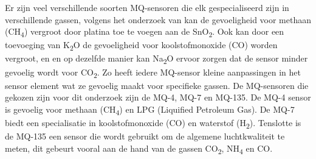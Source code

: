 Er zijn veel verschillende soorten MQ-sensoren die elk gespecialiseerd zijn in verschillende gassen, volgens het onderzoek van
kan de gevoeligheid voor methaan (CH\textsubscript{4}) vergroot door platina toe te voegen aan de SnO\textsubscript{2}. Ook kan door een toevoeging van K\textsubscript{2}O de gevoeligheid voor koolstofmonoxide (CO) worden vergroot, en en op dezelfde manier kan Na\textsubscript{2}O ervoor zorgen dat de sensor minder gevoelig wordt voor CO\textsubscript{2}. Zo heeft iedere MQ-sensor kleine aanpassingen in het sensor element wat ze gevoelig maakt voor specifieke gassen.
De MQ-sensoren die gekozen zijn voor dit onderzoek zijn de MQ-4, MQ-7 en MQ-135. De MQ-4 sensor is gevoelig voor methaan (CH\textsubscript{4}) en LPG (Liquified Petroleum Gas). De MQ-7 biedt een specialisatie in koolstofmonoxide (CO) en waterstof (H\textsubscript{2}). Tenslotte is de MQ-135 een sensor die wordt gebruikt om de algemene luchtkwaliteit te meten, dit gebeurt vooral aan de hand van de gassen CO\textsubscript{2}, NH\textsubscript{4} en CO.



